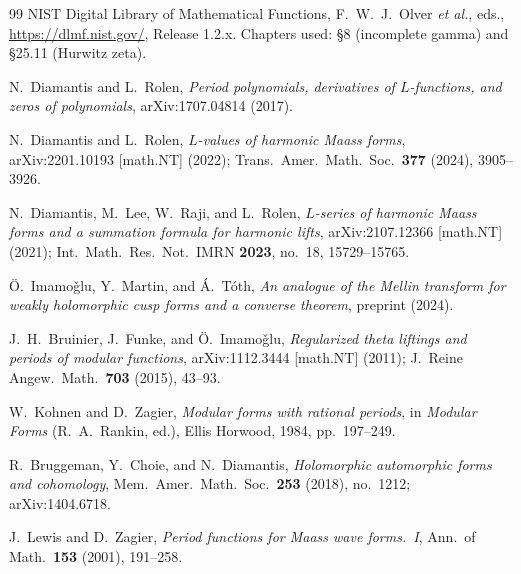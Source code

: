 \documentclass[11pt]{article}
\numberwithin{equation}{section}  %
\begin{document}
\begin{thebibliography}{99}
NIST Digital Library of Mathematical Functions,
F.~W.~J.\ Olver \emph{et al.}, eds.,
\url{https://dlmf.nist.gov/}, Release 1.2.x.
Chapters used: \S8 (incomplete gamma) and \S25.11 (Hurwitz zeta).

N.\ Diamantis and L.\ Rolen,
\emph{Period polynomials, derivatives of $L$-functions, and zeros of polynomials},
arXiv:1707.04814 (2017).

N.\ Diamantis and L.\ Rolen,
\emph{$L$-values of harmonic Maass forms},
arXiv:2201.10193 [math.NT] (2022); Trans.\ Amer.\ Math.\ Soc.\ \textbf{377} (2024), 3905--3926.

N.\ Diamantis, M.\ Lee, W.\ Raji, and L.\ Rolen,
\emph{$L$-series of harmonic Maass forms and a summation formula for harmonic lifts},
arXiv:2107.12366 [math.NT] (2021); Int.\ Math.\ Res.\ Not.\ IMRN \textbf{2023}, no.~18, 15729--15765.

\"O.\ Imamo\v{g}lu, Y.\ Martin, and \'A.\ T\'oth,
\emph{An analogue of the Mellin transform for weakly holomorphic cusp forms and a converse theorem},
preprint (2024).

J.~H.\ Bruinier, J.\ Funke, and \"O.\ Imamo\v{g}lu,
\emph{Regularized theta liftings and periods of modular functions},
arXiv:1112.3444 [math.NT] (2011); J.\ Reine Angew.\ Math.\ \textbf{703} (2015), 43--93.


W.\ Kohnen and D.\ Zagier,
\emph{Modular forms with rational periods},
in \emph{Modular Forms} (R.~A.\ Rankin, ed.), Ellis Horwood, 1984, pp.\ 197--249.

R.\ Bruggeman, Y.\ Choie, and N.\ Diamantis,
\emph{Holomorphic automorphic forms and cohomology},
Mem.\ Amer.\ Math.\ Soc.\ \textbf{253} (2018), no.\ 1212; arXiv:1404.6718.

J.\ Lewis and D.\ Zagier,
\emph{Period functions for Maass wave forms.\ I},
Ann.\ of Math.\ \textbf{153} (2001), 191--258.

\end{thebibliography}
\end{document}
